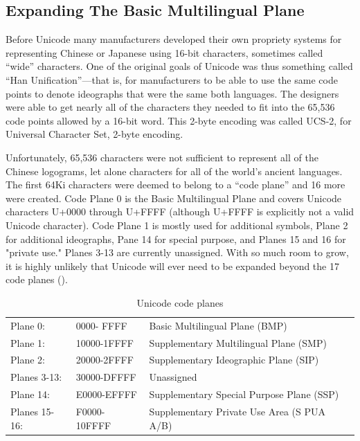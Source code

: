 \subsection{Expanding The Basic Multilingual Plane}

Before Unicode many manufacturers developed their own propriety
systems for representing Chinese or Japanese using 16-bit characters,
sometimes called ``wide'' characters. One of the original goals of
Unicode was thus something called ``Han Unification''---that is, for
manufacturers to be able to use the same code points to denote
ideographs that were the same both languages. The designers were able
to get nearly all of the characters they needed to fit into the 65,536
code points allowed by a 16-bit word. This 2-byte encoding was called
UCS-2, for Universal Character Set, 2-byte encoding.

Unfortunately, 65,536 characters were not sufficient to represent all
of the Chinese logograms, let alone characters for all of the world's
ancient languages. The first 64Ki characters were deemed to belong to
a ``code plane'' and 16 more were created. Code Plane 0 is the Basic
Multilingual Plane and covers Unicode characters U+0000 through U+FFFF
(although U+FFFF is explicitly not a valid Unicode character). Code
Plane 1 is mostly used for additional symbols, Plane 2 for additional
ideographs, Pane 14 for special purpose, and Planes 15 and 16 for
"private use." Planes 3-13 are currently unassigned. With so much room
to grow, it is highly unlikely that Unicode will ever need to be
expanded beyond the 17 code planes ().

\begin{table}
\begin{tabular}{lll}
	Plane 0:    &   0000- FFFF &   Basic  Multilingual Plane (BMP)\\
	Plane 1:    &  10000-1FFFF &   Supplementary Multilingual Plane (SMP)\\
	Plane 2:    &  20000-2FFFF &   Supplementary Ideographic Plane (SIP)\\
	Planes 3-13:&  30000-DFFFF &   Unassigned\\
	Plane 14:   &  E0000-EFFFF &   Supplementary Special Purpose Plane (SSP)\\
	Planes 15-16:& F0000-10FFFF&   Supplementary Private Use Area (S PUA A/B)\\
\end{tabular}
\caption{Unicode code planes}\label{code-planes}
\end{table}

